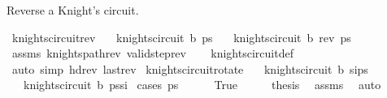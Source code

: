 \begin{isabellebody}
\begin{isamarkuptext}
Reverse a Knight's circuit.%
\end{isamarkuptext}\isamarkuptrue%
\isamarkupfalse%
\ knights{\isacharunderscore}{\kern0pt}circuit{\isacharunderscore}{\kern0pt}rev{\isacharcolon}{\kern0pt}\isanewline
\ \ \ {\isachardoublequoteopen}knights{\isacharunderscore}{\kern0pt}circuit\ b\ ps{\isachardoublequoteclose}\isanewline
\ \ \ {\isachardoublequoteopen}knights{\isacharunderscore}{\kern0pt}circuit\ b\ {\isacharparenleft}{\kern0pt}rev\ ps{\isacharparenright}{\kern0pt}{\isachardoublequoteclose}\isanewline
%
\isadelimproof
\ \ %
\endisadelimproof
%
\isatagproof
{}\isamarkupfalse%
\ assms\ knights{\isacharunderscore}{\kern0pt}path{\isacharunderscore}{\kern0pt}rev\ valid{\isacharunderscore}{\kern0pt}step{\isacharunderscore}{\kern0pt}rev\isanewline
\ \ \isamarkupfalse%
\ knights{\isacharunderscore}{\kern0pt}circuit{\isacharunderscore}{\kern0pt}def\ \isamarkupfalse%
\ {\isacharparenleft}{\kern0pt}auto\ simp{\isacharcolon}{\kern0pt}\ hd{\isacharunderscore}{\kern0pt}rev\ last{\isacharunderscore}{\kern0pt}rev{\isacharparenright}{\kern0pt}%
\endisatagproof
{\isafoldproof}%
%
\isadelimproof
\isanewline
%
\endisadelimproof
\isanewline
\isanewline
\isanewline
\isanewline
{}\isamarkupfalse%
\ knights{\isacharunderscore}{\kern0pt}circuit{\isacharunderscore}{\kern0pt}rotate{}{\isacharcolon}{\kern0pt}\isanewline
\ \ \ {\isachardoublequoteopen}knights{\isacharunderscore}{\kern0pt}circuit\ b\ {\isacharparenleft}{\kern0pt}s\isactrlsub i{\isacharhash}{\kern0pt}ps{\isacharparenright}{\kern0pt}{\isachardoublequoteclose}\isanewline
\ \ \ {\isachardoublequoteopen}knights{\isacharunderscore}{\kern0pt}circuit\ b\ {\isacharparenleft}{\kern0pt}ps{\isacharat}{\kern0pt}{\isacharbrackleft}{\kern0pt}s\isactrlsub i{\isacharbrackright}{\kern0pt}{\isacharparenright}{\kern0pt}{\isachardoublequoteclose}\isanewline
%
\isadelimproof
%
\endisadelimproof
%
\isatagproof
{}\isamarkupfalse%
\ {\isacharparenleft}{\kern0pt}cases\ {\isachardoublequoteopen}ps\ {\isacharequal}{\kern0pt}\ {\isacharbrackleft}{\kern0pt}{\isacharbrackright}{\kern0pt}{\isachardoublequoteclose}{\isacharparenright}{\kern0pt}\isanewline
\ \ \isamarkupfalse%
\ True\isanewline
\ \ \isamarkupfalse%
\ \isamarkupfalse%
\ {\isacharquery}{\kern0pt}thesis\ \isamarkupfalse%
\ assms\ \isamarkupfalse%
\ auto\isanewline
{}\isamarkupfalse%

\end{isabellebody}

